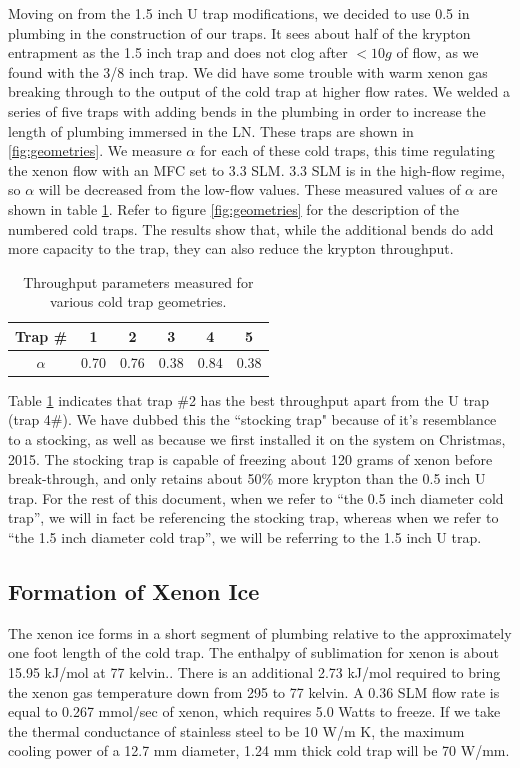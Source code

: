 \documentclass[12pt]{article}
\begin{document}
Moving on from the 1.5 inch U trap modifications, we decided to use 0.5 in plumbing in the construction of our traps. It sees about half of the krypton entrapment as the 1.5 inch trap and does not clog after $<10g$ of flow, as we found with the 3/8 inch trap. We did have some trouble with warm xenon gas breaking through to the output of the cold trap at higher flow rates. We welded a series of five traps with adding bends in the plumbing in order to increase the length of plumbing immersed in the LN. These traps are shown in \ref{fig:geometries}. We measure $\alpha$ for each of these cold traps, this time regulating the xenon flow with an MFC set to 3.3 SLM. 3.3 SLM is in the high-flow regime, so $\alpha$ will be decreased from the low-flow values. These measured values of $\alpha$ are shown in table \ref{tab:geo}. Refer to figure \ref{fig:geometries} for the description of the numbered cold traps. The results show that, while the additional bends do add more capacity to the trap, they can also reduce the krypton throughput.
\begin{table}
 \label{tab:geo}
 \begin{tabular}{c || c c c c c}
 \hline
 \hline
 Trap \# & 1 & 2 & 3 & 4 & 5 \\ [0.5ex] 
 \hline\hline
 $\alpha$ & 0.70 & 0.76 & 0.38 & 0.84 & 0.38 \\ [1ex] 
\hline
\end{tabular}
\caption{Throughput parameters measured for various cold trap geometries.}
\end{table}

Table \ref{tab:geo} indicates that trap \#2 has the best throughput apart from the U trap (trap 4\#). We have dubbed this the ``stocking trap" because of it's resemblance to a stocking, as well as because we first installed it on the system on Christmas, 2015. The stocking trap is capable of freezing about 120 grams of xenon before break-through, and only retains about 50\% more krypton than the 0.5 inch U trap. For the rest of this document, when we refer to ``the 0.5 inch diameter cold trap'', we will in fact be referencing the stocking trap, whereas when we refer to ``the 1.5 inch diameter cold trap'', we will be referring to the 1.5 inch U trap.


\subsection{Formation of Xenon Ice}
\label{sec:iceform}
The xenon ice forms in a short segment of plumbing relative to the approximately one foot length of the cold trap. The enthalpy of sublimation for xenon is about 15.95 kJ/mol at 77 kelvin.\cite{vaporpressure}. There is an additional 2.73 kJ/mol required to bring the xenon gas temperature down from 295 to 77 kelvin. A 0.36 SLM flow rate is equal to 0.267 mmol/sec of xenon, which requires 5.0 Watts to freeze. If we take the thermal conductance of stainless steel to be 10 W/m K, the maximum cooling power of a 12.7 mm diameter, 1.24 mm thick cold trap will be 70 W/mm. 
\end{document}
